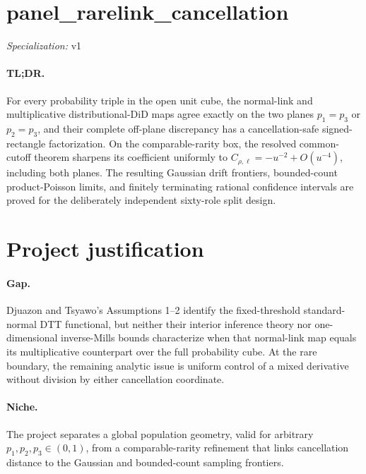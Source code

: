 \documentclass{article}
\begin{document}
\sloppy

\section*{panel\_\allowbreak{}rarelink\_\allowbreak{}cancellation}

\noindent\textit{Specialization:} v1\par

\paragraph{TL;DR.} For every probability triple in the open unit cube, the normal-link and multiplicative distributional-DiD maps agree exactly on the two planes \(p_1=p_3\) or \(p_2=p_3\), and their complete off-plane discrepancy has a cancellation-safe signed-rectangle factorization. On the comparable-rarity box, the resolved common-cutoff theorem sharpens its coefficient uniformly to \(C_{\rho,\ell}=-u^{-2}+O(u^{-4})\), including both planes. The resulting Gaussian drift frontiers, bounded-count product-Poisson limits, and finitely terminating rational confidence intervals are proved for the deliberately independent sixty-role split design.

\section{Project justification}

\paragraph{Gap.} Djuazon and Tsyawo's Assumptions 1--2 identify the fixed-threshold standard-normal DTT functional, but neither their interior inference theory nor one-dimensional inverse-Mills bounds characterize when that normal-link map equals its multiplicative counterpart over the full probability cube. At the rare boundary, the remaining analytic issue is uniform control of a mixed derivative without division by either cancellation coordinate.

\paragraph{Niche.} The project separates a global population geometry, valid for arbitrary \(p_1,p_2,p_3\in(0,1)\), from a comparable-rarity refinement that links cancellation distance to the Gaussian and bounded-count sampling frontiers.
\end{document}
